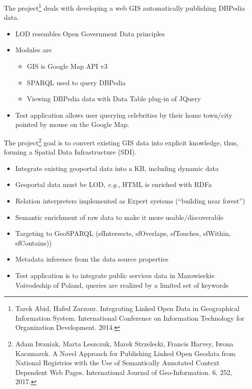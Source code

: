 \documentclass[
]{ceurart}
\begin{document}
   The project\footnote{Tarek Abid, Hafed Zarzour. Integrating Linked Open Data in Geographical
Information System. International Conference on Information Technology for Organization Development. 2014. } deals with developing a web GIS automatically publishing DBPedia data.
  \begin{itemize}
  \item LOD resembles Open Government Data principles
  \item Modules are
    \begin{itemize}
    \item GIS is Google Map API v3
    \item SPARQL used to query DBPedia
    \item Viewing DBPedia data with Data Table plug-in of JQuery
    \end{itemize}
  \item Test application allows user querying celebrities by their home town/city pointed by mouse on the Google Map.
  \end{itemize}

   The project\footnote{Adam Iwaniak, Marta Leszczuk, Marek Strzelecki, Francis Harvey, Iwona Kaczmarek. A Novel Approach for Publishing Linked Open Geodata from National Registries with the Use of Semantically Annotated Context Dependent Web Pages. International Journal of Geo-Information. 6, 252, 2017. } goal is to convert existing GIS data into explicit knowledge, thus, forming a Spatial Data Infrastructure (SDI).
  \begin{itemize}
  \item Integrate existing geoportal data into a KB, including dynamic data
  \item Geoportal data must be LOD, \emph{e.g.}, HTML is enriched with RDFa
  \item Relation interpreters implemented as Expert systems (``building near forest'')
  \item Semantic enrichment of raw data to make it more usable/discoverable
  \item Targeting to GeoSPARQL (sfIntersects, sfOverlaps, sfTouches, sfWithin, sfContains))
  \item Metadata inference from the data source properties
  \item Test application is to integrate public services data in Mazowieckie Voivodeship of Poland, queries are realized by a limited set of keywords
  \end{itemize}
\end{document}
